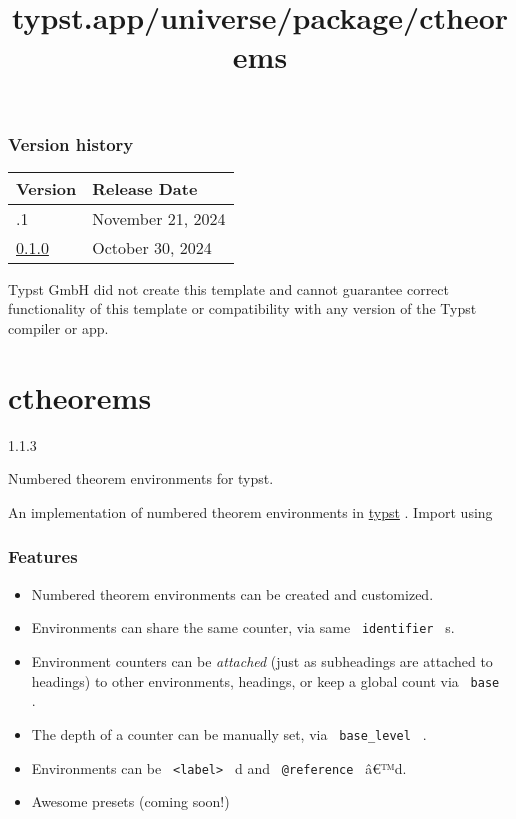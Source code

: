 \subsubsection{Version history}\label{version-history}

\begin{longtable}[]{@{}ll@{}}
\toprule\noalign{}
Version & Release Date \\
\midrule\noalign{}
\endhead
\bottomrule\noalign{}
\endlastfoot
0.1.1 & November 21, 2024 \\
\href{https://typst.app/universe/package/accelerated-jacow/0.1.0/}{0.1.0}
& October 30, 2024 \\
\end{longtable}

Typst GmbH did not create this template and cannot guarantee correct
functionality of this template or compatibility with any version of the
Typst compiler or app.


\title{typst.app/universe/package/ctheorems}

\label{banner}
\section{ctheorems}\label{ctheorems}

{ 1.1.3 }

Numbered theorem environments for typst.

\label{readme}
An implementation of numbered theorem environments in
\href{https://github.com/typst/typst}{typst} . Import using

\begin{Shaded}
\begin{Highlighting}[]
\end{Highlighting}
\end{Shaded}

\subsubsection{Features}\label{features}

\begin{itemize}
\tightlist
\item
  Numbered theorem environments can be created and customized.
\item
  Environments can share the same counter, via same
  \texttt{\ identifier\ } s.
\item
  Environment counters can be \emph{attached} (just as subheadings are
  attached to headings) to other environments, headings, or keep a
  global count via \texttt{\ base\ } .
\item
  The depth of a counter can be manually set, via
  \texttt{\ base\_level\ } .
\item
  Environments can be \texttt{\ \textless{}label\textgreater{}\ }
  \textquotesingle d and \texttt{\ @reference\ } â€™d.
\item
  Awesome presets (coming soon!)
\end{itemize}


